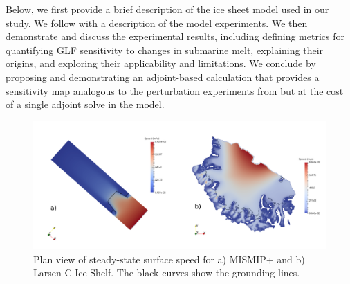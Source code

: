 \documentclass[tc, manuscript]{copernicus}
\begin{document}

Below, we first provide a brief description of the ice sheet model used in our study. We follow with a description of the model experiments. We then demonstrate and discuss the experimental results, including defining metrics for quantifying GLF sensitivity to changes in submarine melt, explaining their origins, and exploring their applicability and limitations.  We conclude by proposing and demonstrating an adjoint-based calculation that provides a sensitivity map analogous to the perturbation experiments from \citet{reese2018} but at the cost of a single adjoint solve in the model. 


\begin{figure}
\centering
\includegraphics[width=1\linewidth]{figs/mismip+_larsenC.pdf}
\caption{Plan view of steady-state surface speed for a) MISMIP+ and b) Larsen C Ice Shelf. The black curves show the grounding lines.}
\label{mismip+_larsenC}
\end{figure}
\end{document}

